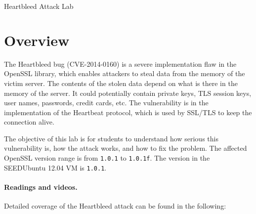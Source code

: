 
\newcommand{\commonfolder}{../../common-files}





\newcommand{\heartFigs}{./Figs}




\begin{center}
{\LARGE Heartbleed Attack Lab}
\end{center}




\section{Overview}



The Heartbleed bug (CVE-2014-0160) is a severe implementation flaw in the
OpenSSL library, which enables attackers to steal data 
from the memory of the victim server. The contents of the stolen data
depend on what is there in the memory of the server. It could
potentially contain private keys, TLS session keys, user names,
passwords, credit cards, etc. The vulnerability is in the implementation of
the Heartbeat protocol,  which is used by SSL/TLS to keep the connection alive. 


The objective of this lab is for students to understand how serious this
vulnerability is, how the attack works, and how to fix the problem. The
affected OpenSSL version range is from {\tt 1.0.1} to {\tt 1.0.1f}. The
version in the SEEDUbuntu 12.04 VM is {\tt 1.0.1}. 



\paragraph{Readings and videos.}
Detailed coverage of the Heartbleed attack can be found in the following:

